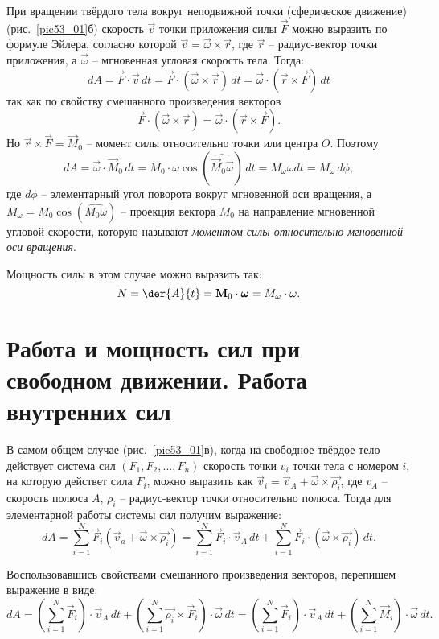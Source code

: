 При вращении твёрдого тела вокруг неподвижной точки 
(сферическое движение) (рис.~\ref{pic53_01}б) скорость \( \vec{v} \) точки 
приложения силы \( \vec{F} \) можно выразить по 
формуле Эйлера, согласно которой \( \vec{v} = \vec{\omega}\times\vec{r} \), где 
\( \vec{r} \) -- радиус-вектор точки приложения, а \( \vec{\omega} \) -- 
мгновенная угловая скорость тела. Тогда:
\[ 
	dA = \vec{F}\cdot\vec{v}\,dt = 
	\vec{F}\cdot\left(\vec{\omega}\times\vec{r}\right)\,dt =
	\vec{\omega}\cdot\left(\vec{r}\times\vec{F}\right)\,dt
\]
так как по свойству смешанного произведения векторов 
\[
	\vec{F}\cdot\left(\vec{\omega}\times\vec{r}\right) = \vec{\omega}\cdot\left(\vec{r}\times\vec{F}\right).
\] 
Но \( \vec{r}\times\vec{F} = \vec{M}_0 \) -- момент силы относительно точки или 
центра \( O \). Поэтому 
\[ 
	dA = \vec{\omega}\cdot\vec{M}_0\,dt = 
	M_0\cdot\omega\cos(\widehat{\vec{M}_0\vec{\omega}})\,dt =
	M_\omega\omega dt = M_\omega\,d\phi,
\]
где \( d\phi \) -- элементарный угол поворота вокруг мгновенной оси 
вращения, а \( M_\omega = M_0\cos(\widehat{M_0\omega}) \) -- 
проекция вектора \( M_0 \) на направление мгновенной угловой 
скорости, которую называют \emph{моментом силы относительно мгновенной 
оси вращения}.

Мощность силы в этом случае можно выразить так:
\[ 
	N = \der{A}{t} = \vec{M}_{0}\cdot\vec{\omega} = M_\omega\cdot\omega.
\]

\section{Работа и мощность сил при свободном движении. Работа внутренних сил}

В самом общем случае (рис.~\ref{pic53_01}в), когда на свободное твёрдое тело 
действует система сил \( \left( F_1, F_2, ..., F_n \right) \) скорость 
точки \( v_i \) точки тела с номером \( i \), на которую действет сила 
\( F_i \), можно выразить как 
\( \vec{v}_{i} = \vec{v}_A + \vec{\omega}\times\vec{\rho_i} \), 
где \( v_A \) -- скорость полюса \( A \), \( \rho_i \) -- радиус-вектор 
точки относительно полюса. Тогда для элементарной работы системы сил 
получим выражение:
\[ 
	dA = \sum_{i=1}^{N} \vec{F}_i
	(\vec{v}_{a} + \vec{\omega}\times\vec{\rho_i}) =
	\sum_{i=1}^{N}\vec{F}_i\cdot\vec{v}_A\,dt + 
	\sum_{i=1}^{N}\vec{F}_i\cdot(\vec{\omega}\times\vec{\rho_i})\,dt.
\]

Воспользовавшись свойствами смешанного произведения векторов, перепишем 
выражение в виде:
\[ 
	dA = \left( \sum_{i=1}^{N}\vec{F}_i \right)\cdot\vec{v}_A\,dt + 
	\left( \sum_{i=1}^{N} \vec{\rho_i}\times\vec{F}_i\right)\cdot
	\vec{\omega}\,dt = \left( \sum_{i=1}^{N}\vec{F}_i \right)\cdot\vec{v}_A\,dt
	+ \left( \sum_{i=1}^{N} \vec{M}_{i} \right)\cdot\vec{\omega}\,dt.
\]

